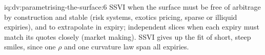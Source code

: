 \begin{solution}{iq:dv:parametrising-the-surface:6}
SSVI when the surface must be free of arbitrage by construction and stable (risk systems, exotics
pricing, sparse or illiquid expiries), and to extrapolate in expiry; independent slices when each expiry
must match its quotes closely (market making). SSVI gives up the fit of short, steep smiles, since one
$\rho$ and one curvature law span all expiries.
\end{solution}
